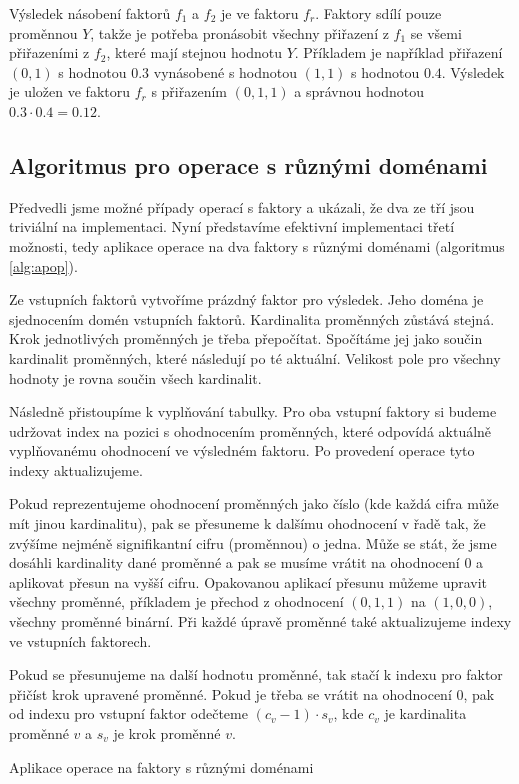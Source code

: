 Výsledek násobení faktorů $f_1$ a $f_2$ je ve faktoru $f_r$.
Faktory sdílí pouze proměnnou $Y$, takže je potřeba pronásobit všechny přiřazení z $f_1$ se všemi přiřazeními z $f_2$, které mají stejnou hodnotu $Y$.
Příkladem je například přiřazení $(0, 1)$ s hodnotou $0.3$ vynásobené s hodnotou $(1, 1)$ s hodnotou $0.4$.
Výsledek je uložen ve faktoru $f_r$ s přiřazením $(0, 1, 1)$ a správnou hodnotou $0.3 \cdot 0.4 = 0.12$.

\subsection{Algoritmus pro operace s různými doménami}

Předvedli jsme možné případy operací s faktory a ukázali, že dva ze tří jsou triviální na implementaci.
Nyní představíme efektivní implementaci třetí možnosti, tedy aplikace operace na dva faktory s různými doménami (algoritmus \ref{alg:apop}).

Ze vstupních faktorů vytvoříme prázdný faktor pro výsledek.
Jeho doména je sjednocením domén vstupních faktorů.
Kardinalita proměnných zůstává stejná.
Krok jednotlivých proměnných je třeba přepočítat.
Spočítáme jej jako součin kardinalit proměnných, které následují po té aktuální.
Velikost pole pro všechny hodnoty je rovna součin všech kardinalit.

Následně přistoupíme k vyplňování tabulky.
Pro oba vstupní faktory si budeme udržovat index na pozici s ohodnocením proměnných, které odpovídá aktuálně vyplňovanému ohodnocení ve výsledném faktoru.
Po provedení operace tyto indexy aktualizujeme.

Pokud reprezentujeme ohodnocení proměnných jako číslo (kde každá cifra může mít jinou kardinalitu), pak se přesuneme k dalšímu ohodnocení v řadě tak, že zvýšíme nejméně signifikantní cifru (proměnnou) o jedna.
Může se stát, že jsme dosáhli kardinality dané proměnné a pak se musíme vrátit na ohodnocení 0 a aplikovat přesun na vyšší cifru.
Opakovanou aplikací přesunu můžeme upravit všechny proměnné, příkladem je přechod z ohodnocení $(0, 1, 1)$ na $(1, 0, 0)$, všechny proměnné binární.
Při každé úpravě proměnné také aktualizujeme indexy ve vstupních faktorech.

Pokud se přesunujeme na další hodnotu proměnné, tak stačí k indexu pro faktor přičíst krok upravené proměnné.
Pokud je třeba se vrátit na ohodnocení 0, pak od indexu pro vstupní faktor odečteme $(c_v - 1) \cdot s_v$, kde $c_v$ je kardinalita proměnné $v$ a $s_v$ je krok proměnné $v$.

\begin{algorithm}
\caption{Aplikace operace na faktory s různými doménami}
\label{alg:apop}
\begin{algorithmic}
\EndFunction
\end{algorithmic}
\end{algorithm}
